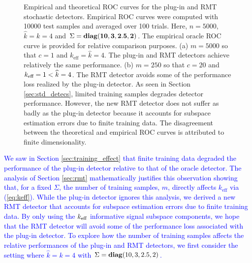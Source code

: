 \begin{figure}
\centering
{}
\vspace{-0.1in}
\caption{Empirical and theoretical ROC curves for the plug-in and RMT stochastic detectors. Empirical ROC curves were computed with 10000 test samples and averaged over 100 trials. Here, $n=5000$, $\widehat{k}=k=4$ and $\Sigma = \mathop{\bf diag}({\bf{10,3,2.5,2}})$. The empirical oracle ROC curve is provided for relative comparison purposes. (a) $m=5000$ so that $c=1$ and $k_\text{eff}=\widehat{k}=4$. The plug-in and RMT detectors achieve relatively the same performance. (b) $m=250$ so that $c=20$ and $k_\text{eff}=1<\widehat{k}=4$. The RMT detector avoids some of the performance loss realized by the plug-in detector. As seen in Section \ref{sec:std_detecs}, limited training samples degrades detector performance. However, the new RMT detector does not suffer as badly as the plug-in detector because it accounts for subspace estimation errors due to finite training data. The disagreement between the theoretical and empirical ROC curves is attributed to finite dimensionality.}
\label{fig:stoch_m_effect}
\vspace{-0.3in}
\end{figure}

\textcolor{blue}{We saw in Section \ref{sec:training_effect} that finite training data degraded the performance of the plug-in detector relative to that of the oracle detector. The analysis of Section \ref{sec:rmt} mathematically justifies this observation showing that, for a fixed $\Sigma$, the number of training samples, $m$, directly affects $k_\text{eff}$ via (\ref{eq:keff}). While the plug-in detector ignores this analysis, we derived a new RMT detector that accounts for subspace estimation errors due to finite training data. By only using the $k_\text{eff}$ informative signal subspace components, we hope that the RMT detector will avoid some of the performance loss associated with the plug-in detector. To explore how the number of training samples affects the relative performances of the plug-in and RMT detectors, we first consider the setting where $\widehat{k}=k=4$ with $\Sigma=\mathop{\bf diag}(10,3,2.5,2)$. }

